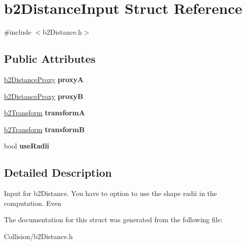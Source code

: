 \hypertarget{structb2DistanceInput}{}\section{b2\+Distance\+Input Struct Reference}
\label{structb2DistanceInput}


{\ttfamily \#include $<$b2\+Distance.\+h$>$}

\subsection*{Public Attributes}
\begin{DoxyCompactItemize}
\item 
\mbox{\label{structb2DistanceInput_a84d378f4f0e2f06fbe03d413e9dfbbd9}} 
\mbox{\hyperlink{structb2DistanceProxy}{b2\+Distance\+Proxy}} {\bfseries proxyA}
\item 
\mbox{\label{structb2DistanceInput_ad08521a9cdf9d418ececfd44de83a5d3}} 
\mbox{\hyperlink{structb2DistanceProxy}{b2\+Distance\+Proxy}} {\bfseries proxyB}
\item 
\mbox{\label{structb2DistanceInput_a0889c2f7120ba521d6e40e2a22834ddb}} 
\mbox{\hyperlink{structb2Transform}{b2\+Transform}} {\bfseries transformA}
\item 
\mbox{\label{structb2DistanceInput_a47352d7c5b3db80b2fb8cf338f1c1895}} 
\mbox{\hyperlink{structb2Transform}{b2\+Transform}} {\bfseries transformB}
\item 
\mbox{\label{structb2DistanceInput_ab72a770be4a91997d00112409de5fea7}} 
bool {\bfseries use\+Radii}
\end{DoxyCompactItemize}


\subsection{Detailed Description}
Input for b2\+Distance. You have to option to use the shape radii in the computation. Even 

The documentation for this struct was generated from the following file\+:\begin{DoxyCompactItemize}
\item 
Collision/b2\+Distance.\+h\end{DoxyCompactItemize}
